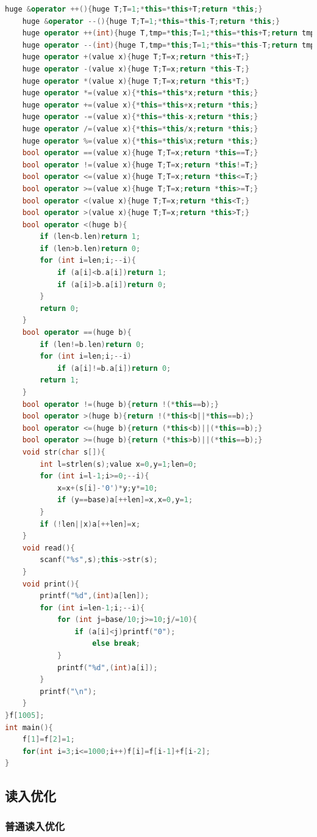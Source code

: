\documentclass{article}
\begin{document}
\begin{lstlisting}[language=C++]
	huge &operator ++(){huge T;T=1;*this=*this+T;return *this;}
	huge &operator --(){huge T;T=1;*this=*this-T;return *this;}
	huge operator ++(int){huge T,tmp=*this;T=1;*this=*this+T;return tmp;}
	huge operator --(int){huge T,tmp=*this;T=1;*this=*this-T;return tmp;}
	huge operator +(value x){huge T;T=x;return *this+T;}
	huge operator -(value x){huge T;T=x;return *this-T;}
	huge operator *(value x){huge T;T=x;return *this*T;}
	huge operator *=(value x){*this=*this*x;return *this;}
	huge operator +=(value x){*this=*this+x;return *this;}
	huge operator -=(value x){*this=*this-x;return *this;}
	huge operator /=(value x){*this=*this/x;return *this;}
	huge operator %=(value x){*this=*this%x;return *this;}
	bool operator ==(value x){huge T;T=x;return *this==T;}
	bool operator !=(value x){huge T;T=x;return *this!=T;}
	bool operator <=(value x){huge T;T=x;return *this<=T;}
	bool operator >=(value x){huge T;T=x;return *this>=T;}
	bool operator <(value x){huge T;T=x;return *this<T;}
	bool operator >(value x){huge T;T=x;return *this>T;}
	bool operator <(huge b){
		if (len<b.len)return 1;
		if (len>b.len)return 0;
		for (int i=len;i;--i){
			if (a[i]<b.a[i])return 1;
			if (a[i]>b.a[i])return 0;
		}
		return 0;
	}
	bool operator ==(huge b){
		if (len!=b.len)return 0;
		for (int i=len;i;--i)
			if (a[i]!=b.a[i])return 0;
		return 1;
	}
	bool operator !=(huge b){return !(*this==b);}
	bool operator >(huge b){return !(*this<b||*this==b);}
	bool operator <=(huge b){return (*this<b)||(*this==b);}
	bool operator >=(huge b){return (*this>b)||(*this==b);}
	void str(char s[]){
		int l=strlen(s);value x=0,y=1;len=0;
		for (int i=l-1;i>=0;--i){
			x=x+(s[i]-'0')*y;y*=10;
			if (y==base)a[++len]=x,x=0,y=1;
		}
		if (!len||x)a[++len]=x;
	}
	void read(){
		scanf("%s",s);this->str(s);
	}
	void print(){
		printf("%d",(int)a[len]);
		for (int i=len-1;i;--i){
			for (int j=base/10;j>=10;j/=10){
				if (a[i]<j)printf("0");
					else break;
			}
			printf("%d",(int)a[i]);
		}
		printf("\n");
	}
}f[1005];
int main(){
	f[1]=f[2]=1;
	for(int i=3;i<=1000;i++)f[i]=f[i-1]+f[i-2];
}
\end{lstlisting}

\subsection{读入优化}

\subsubsection{普通读入优化}
\end{document}
